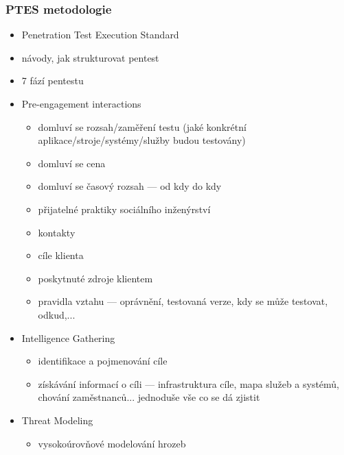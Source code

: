 \subsubsection*{PTES metodologie}
\begin{itemize}
	\item Penetration Test Execution Standard
	\item návody, jak strukturovat pentest
	\item 7 fází pentestu
	\item Pre-engagement interactions
	\begin{itemize}
		\item domluví se rozsah/zaměření testu (jaké konkrétní aplikace/stroje/systémy/služby budou testovány)
		\item domluví se cena
		\item domluví se časový rozsah --- od kdy do kdy
		\item přijatelné praktiky sociálního inženýrství
		\item kontakty
		\item cíle klienta
		\item poskytnuté zdroje klientem
		\item pravidla vztahu --- oprávnění, testovaná verze, kdy se může testovat, odkud,...
	\end{itemize}
	\item Intelligence Gathering
	\begin{itemize}
		\item identifikace a pojmenování cíle
		\item získávání informací o cíli --- infrastruktura cíle, mapa služeb a systémů, chování zaměstnanců... jednoduše vše co se dá zjistit
	\end{itemize}
	\item Threat Modeling
	\begin{itemize}
		\item vysokoúrovňové modelování hrozeb
		\begin{itemize}
		

\end{itemize}
\end{itemize}
\end{itemize}
